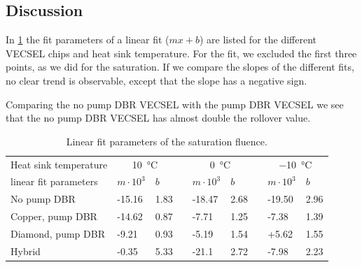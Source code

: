 \subsection*{Discussion}

In \cref{tab:f2} the fit parameters of a linear fit ($mx+b$) are listed for the different VECSEL chips and heat sink temperature. For the fit, we excluded the first three points, as we did for the saturation. If we compare the slopes of the different fits, no clear trend is observable, except that the slope has a negative sign.

Comparing the no pump DBR VECSEL with the pump DBR VECSEL we see that the no pump DBR VECSEL has almost double the rollover value. 

\begin{table}[ht]
    \centering
    \begin{tabular}{lllllllll}
        \hline
        Heat sink temperature & \multicolumn{2}{c}{\qty{10}{\celsius}} &      & \multicolumn{2}{c}{\qty{0}{\celsius}} &              & \multicolumn{2}{c}{\qty{-10}{\celsius}}                          \\ \cline{2-3} \cline{5-6} \cline{8-9}
        linear fit parameters & $m\cdot10^3$                           & $b$  &                                       & $m\cdot10^3$ & $b$                                     &  & $m\cdot10^3$ & $b$  \\ \hline
        No pump DBR           & -15.16                                 & 1.83 &                                       & -18.47       & 2.68                                    &  & -19.50       & 2.96 \\ \hline
        Copper, pump DBR      & -14.62                                 & 0.87 &                                       & -7.71        & 1.25                                    &  & -7.38        & 1.39 \\ \hline
        Diamond, pump DBR     & -9.21                                   & 0.93 &                                       & -5.19         & 1.54                                    &  & +5.62         & 1.55 \\ \hline
        Hybrid                & -0.35                                  & 5.33 &                                       & -21.1       & 2.72                                    &  & -7.98        & 2.23
    \end{tabular}
    \caption{Linear fit parameters of the saturation fluence. }
    \label{tab:f2}
\end{table}
\vspace{-2\baselineskip}

